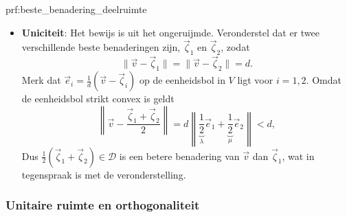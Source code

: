 \begin{prf}{prf:beste_benadering_deelruimte}
\begin{itemize}
\begin{equation*}
                \|\vec{v} - \vec{\zeta}\| \leq \underbrace{\|\vec{v} - \vec{w}_k\|}_{\rightarrow d} + \underbrace{\|\vec{w}_k - \vec{\zeta}\|}_{\rightarrow 0},
            \end{equation*}
            wat $\|\vec{v} - \vec{\zeta}\| = d$ impliceert. De vector $\vec{\zeta}$ is bijgevolg de beste benadering van $\vec{v}$ in $\mathcal{D}$.
\newpage
        \item 
            \textbf{Uniciteit}: Het bewijs is uit het ongeruijmde. Veronderstel dat er twee verschillende beste benaderingen zijn, $\vec{\zeta}_1$ en $\vec{\zeta}_2$, zodat 
            \begin{equation*}
                \|\vec{v} - \vec{\zeta}_1\| = \|\vec{v} - \vec{\zeta}_2\| = d.
            \end{equation*}
            Merk dat $\vec{e}_i = \frac{1}{d}(\vec{v} - \vec{\zeta}_i)$ op de eenheidsbol in $V$ ligt voor $i = 1,2$. Omdat de eenheidsbol strikt convex is geldt
            \begin{equation*}
                \left\| \vec{v} - \frac{\vec{\zeta}_1 + \vec{\zeta}_2}{2} \right\| = d \left\| \underbrace{\frac{1}{2}}_\lambda\vec{e}_1 + \underbrace{\frac{1}{2}}_\mu\vec{e}_2 \right\| < d,
            \end{equation*}
            Dus $\frac{1}{2}(\vec{\zeta}_1 + \vec{\zeta}_2) \in \mathcal{D}$ is een betere benadering van $\vec{v}$ dan $\vec{\zeta}_1$, wat in tegenspraak is met de veronderstelling.
    \end{itemize}
\end{prf}

\subsubsection{Unitaire ruimte en orthogonaliteit}

\vspace{0.5cm}


